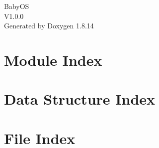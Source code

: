\documentclass[twoside]{book}
\newcommand{\+}{\discretionary{\mbox{\scriptsize$\hookleftarrow$}}{}{}}
\newcommand{\clearemptydoublepage}{%
  \newpage{\pagestyle{empty}\cleardoublepage}%
}
\begin{document}
\hypersetup{pageanchor=false,
             bookmarksnumbered=true,
             pdfencoding=unicode
            }
\begin{titlepage}
\vspace*{7cm}
\begin{center}%
{\Large Baby\+OS \\[1ex]\large V1.\+0.\+0 }\\
\vspace*{1cm}
{\large Generated by Doxygen 1.8.14}\\
\end{center}
\end{titlepage}
\clearemptydoublepage
{}
\tableofcontents
\clearemptydoublepage
{}
\hypersetup{pageanchor=true}

\chapter{Module Index}

\chapter{Data Structure Index}

\chapter{File Index}

\end{document}
